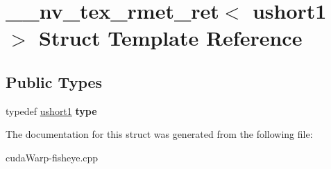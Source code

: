 \hypertarget{struct____nv__tex__rmet__ret_3_01ushort1_01_4}{}\section{\+\_\+\+\_\+nv\+\_\+tex\+\_\+rmet\+\_\+ret$<$ ushort1 $>$ Struct Template Reference}
\label{struct____nv__tex__rmet__ret_3_01ushort1_01_4}
\subsection*{Public Types}
\begin{DoxyCompactItemize}
\item 
typedef \hyperlink{structushort1}{ushort1} {\bfseries type}\hypertarget{struct____nv__tex__rmet__ret_3_01ushort1_01_4_a3a8cbca4a6cf4af4dd13fd9fd7218f02}{}\label{struct____nv__tex__rmet__ret_3_01ushort1_01_4_a3a8cbca4a6cf4af4dd13fd9fd7218f02}

\end{DoxyCompactItemize}


The documentation for this struct was generated from the following file\+:\begin{DoxyCompactItemize}
\item 
cuda\+Warp-\/fisheye.\+cpp\end{DoxyCompactItemize}
